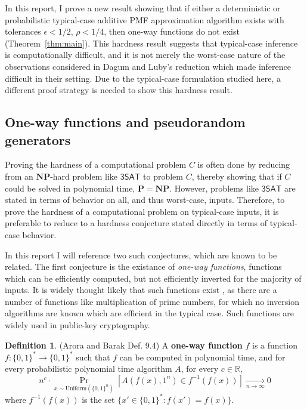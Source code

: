 \documentclass{article}
\renewcommand{\P}{\mathbf{P}}
\newcommand{\NP}{\mathbf{NP}}
\theoremstyle{definition}
\newtheorem{defn}{Definition}
\theoremstyle{remark}
\begin{document}
In this report, I prove a new result showing that if either a deterministic or probabilistic typical-case additive PMF approximation algorithm exists with tolerances $\epsilon < 1/2$, $\rho < 1/4$, then one-way functions do not exist (Theorem~\ref{thm:main}).
This hardness result suggests that typical-case inference is computationally difficult, and it is not merely the worst-case nature of the observations considered in Dagum and Luby's reduction which made inference difficult in their setting.
Due to the typical-case formulation studied here, a different proof strategy is needed to show this hardness result.

\subsection{One-way functions and pseudorandom generators}
Proving the hardness of a computational problem $C$ is often done by reducing from an $\NP$-hard problem like $\mathsf{3SAT}$ to problem $C$, thereby showing that if $C$ could be solved in polynomial time, $\P = \NP$.
However, problems like $\mathsf{3SAT}$ are stated in terms of behavior on all, and thus worst-case, inputs.
Therefore, to prove the hardness of a computational problem on typical-case inputs, it is preferable to reduce to a hardness conjecture stated directly in terms of typical-case behavior.

In this report I will reference two such conjectures, which are known to be related.
The first conjecture is the existance of \textit{one-way functions}, functions which can be efficiently computed, but not efficiently inverted for the majority of inputs.
It is widely thought likely that such functions exist \cite{arora2009computational}, as there are a number of functions like multiplication of prime numbers, for which no inversion algorithms are known which are efficient in the typical case.
Such functions are widely used in public-key cryptography.

\begin{defn}{(Arora and Barak Def. 9.4)} \label{def:oneway}
A \textbf{one-way function} $f$ is a function $f : \{0, 1\}^* \to \{0, 1\}^*$ such that $f$ can be computed in polynomial time, and for every probabilistic polynomial time algorithm $A$, for every $c \in \mathbb{R}$,
\begin{equation} \label{eq:oneway}
n^c \cdot \Pr_{x \sim \text{Uniform}(\{0, 1\}^n)}[A(f(x), 1^n) \in f^{-1}(f(x))] \underset{n \to \infty}{\to} 0
\end{equation}
where $f^{-1}(f(x))$ is the set $\{x' \in \{0, 1\}^* : f(x') = f(x)\}$.
\end{defn}
\end{document}
